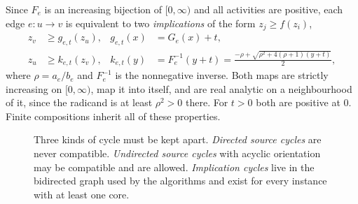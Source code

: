 \documentclass[11pt,a4paper]{article}
\theoremstyle{plain}
\theoremstyle{definition}
\theoremstyle{remark}
\newcommand{\rev}{\rightleftharpoons}
\begin{document}
Since $F_e$ is an increasing bijection of $[0,\infty)$ and all activities are positive, each edge $e\colon u\to v$ is equivalent to two \emph{implications} of the form $z_j\ge f(z_i)$,
\begin{equation}\label{eq:maps}
\begin{aligned}
 z_v&\ge g_{e,t}(z_u), & g_{e,t}(x)&=G_e(x)+t,\\
 z_u&\ge k_{e,t}(z_v), & k_{e,t}(y)&=F_e^{-1}(y+t)=\frac{-\rho+\sqrt{\rho^2+4(\rho+1)(y+t)}}{2},
\end{aligned}
\end{equation}
where $\rho=a_e/b_e$ and $F_e^{-1}$ is the nonnegative inverse. Both maps are strictly increasing on $[0,\infty)$, map it into itself, and are real analytic on a neighbourhood of it, since the radicand is at least $\rho^2>0$ there. For $t>0$ both are positive at $0$. Finite compositions inherit all of these properties.

\begin{figure}[t]
\centering
{}
\caption{Three kinds of cycle must be kept apart. \emph{Directed source cycles} are never compatible. \emph{Undirected source cycles} with acyclic orientation may be compatible and are allowed. \emph{Implication cycles} live in the bidirected graph used by the algorithms and exist for every instance with at least one core.}
\label{fig:implications}
\end{figure}
\end{document}

